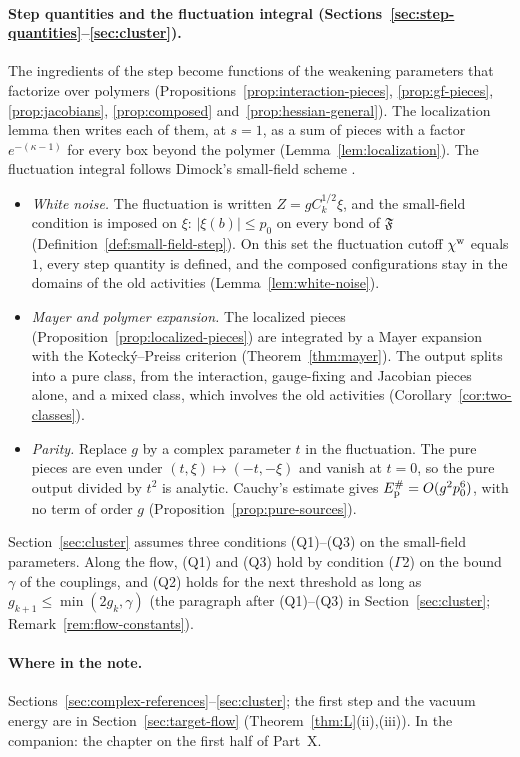 \paragraph{Step quantities and the fluctuation integral (Sections~\ref{sec:step-quantities}--\ref{sec:cluster}).} The ingredients of the step become functions of the weakening parameters that factorize over polymers (Propositions~\ref{prop:interaction-pieces}, \ref{prop:gf-pieces}, \ref{prop:jacobians}, \ref{prop:composed} and~\ref{prop:hessian-general}). The localization lemma then writes each of them, at $s=1$, as a sum of pieces with a factor $e^{-(\kappa-1)}$ for every box beyond the polymer (Lemma~\ref{lem:localization}). The fluctuation integral follows Dimock's small-field scheme \cite{DimockI}.
\begin{itemize}
\item \emph{White noise.} The fluctuation is written $Z=gC_k^{1/2}\xi$, and the small-field condition is imposed on $\xi$: $|\xi(b)|\le p_0$ on every bond of $\mathfrak F$ (Definition~\ref{def:small-field-step}). On this set the fluctuation cutoff $\chi^{\rm w}$ equals $1$, every step quantity is defined, and the composed configurations stay in the domains of the old activities (Lemma~\ref{lem:white-noise}).
\item \emph{Mayer and polymer expansion.} The localized pieces (Proposition~\ref{prop:localized-pieces}) are integrated by a Mayer expansion with the Kotecký--Preiss criterion (Theorem~\ref{thm:mayer}). The output splits into a pure class, from the interaction, gauge-fixing and Jacobian pieces alone, and a mixed class, which involves the old activities (Corollary~\ref{cor:two-classes}).
\item \emph{Parity.} Replace $g$ by a complex parameter $t$ in the fluctuation. The pure pieces are even under $(t,\xi)\mapsto(-t,-\xi)$ and vanish at $t=0$, so the pure output divided by $t^2$ is analytic. Cauchy's estimate gives $E^\#_{\rm p}=O(g^2p_0^6)$, with no term of order $g$ (Proposition~\ref{prop:pure-sources}).
\end{itemize}
Section~\ref{sec:cluster} assumes three conditions (Q1)--(Q3) on the small-field parameters. Along the flow, (Q1) and (Q3) hold by condition ($\Gamma$2) on the bound $\gamma$ of the couplings, and (Q2) holds for the next threshold as long as $g_{k+1}\le\min(2g_k,\gamma)$ (the paragraph after (Q1)--(Q3) in Section~\ref{sec:cluster}; Remark~\ref{rem:flow-constants}).

\paragraph{Where in the note.} Sections~\ref{sec:complex-references}--\ref{sec:cluster}; the first step and the vacuum energy are in Section~\ref{sec:target-flow} (Theorem~\ref{thm:L}(ii),(iii)). In the companion: the chapter on the first half of Part~X.

